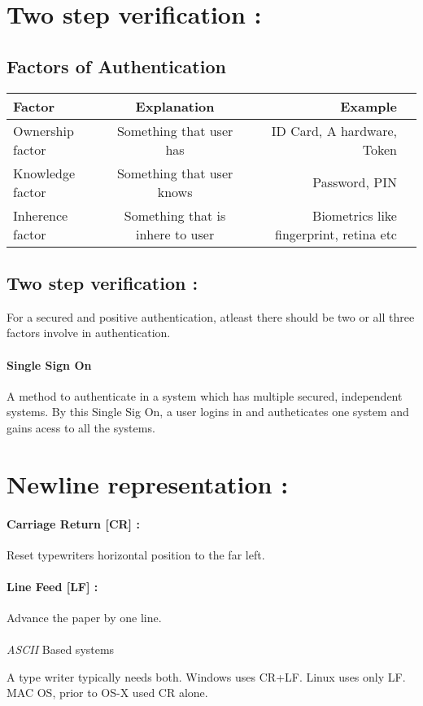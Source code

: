 \documentclass[12pt]{article}
\begin{document}
\section{Two step verification : }
\subsection{Factors of Authentication}
\begin{tabular}{| l | c | r | p{}}
	\hline	
		Factor & Explanation & Example\\
		\hline
		\hline
		Ownership factor & Something that user has & ID Card, A hardware, Token \\ \hline
		Knowledge factor & Something that user knows & Password, PIN \\	\hline
		Inherence factor & Something that is inhere to user & Biometrics like fingerprint, retina etc\\
	\hline
\end{tabular}
\subsection{Two step verification : }
For a secured and positive authentication, atleast there should be two or all three factors involve in authentication.
\paragraph{Single Sign On} A method to authenticate in a system which has multiple secured, independent systems. By this Single Sig On, a user logins in and autheticates one system and gains acess to all the systems.
\pagebreak
\section{Newline representation  : }

\paragraph{Carriage Return [CR] : } Reset typewriters horizontal position to the far left.
\paragraph{Line Feed [LF] : } Advance the paper by one line.
\\
\\
\textit{ASCII }Based systems 

A type writer typically needs both.
Windows uses CR+LF.
Linux uses only LF.
MAC OS, prior to OS-X used CR alone.
\\
\end{document}
